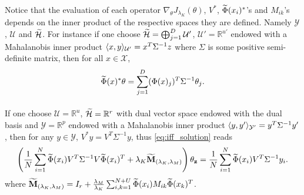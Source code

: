 \begin{remark}
\label{rq:mahalanobis}
Notice that the evaluation of each operator $\nabla_{\theta} J_{\lambda_K}(\theta)$, $V^*$, $\widetilde{\Phi}(x_i)^*$'s and $M_{ik}$'s depends on the inner product of the respective spaces they are defined. Namely $\mathcal{Y}$, $\mathcal{U}$ and $\widetilde{\mathcal{H}}$. For instance if one choose $\widetilde{\mathcal{H}}=\operatorname{\bigoplus}_{j=1}^D \mathcal{U}'$, $\mathcal{U}'=\mathbb{R}^{u'}$ endowed with a Mahalanobis inner product $\langle x,y\rangle_{\mathcal{U}'}=x^T\Sigma^{-1} z$ where $\Sigma$ is some positive semi-definite matrix, then for all $x\in\mathcal{X}$,
\begin{dmath*}
\tildePhi{\omega}(x)^*\theta=\sum_{j=1}^D(\Phi(x)_j)^T \Sigma^{-1}\theta_j.
\end{dmath*}
\paragraph{}
If one choose $\mathcal{U}=\mathbb{R}^u$, $\widetilde{\mathcal{H}}=\mathbb{R}^{r}$ with dual vector space endowed with the dual basis and $\mathcal{Y}=\mathbb{R}^p$ endowed with a Mahalanobis inner product $\langle y,y'\rangle_{\mathcal{Y}'}=y^T\Sigma^{-1} y'$, then for any $y\in\mathcal{Y}$, $V^*y=V^T\Sigma^{-1}y$, thus \cref{eq:iff_solution} reads
\begin{dmath*}
\left(\frac{1}{N}\sum_{i=1}^N \tildePhi{\omega}(x_i)V^T \Sigma^{-1}V\tildePhi{\omega}(x_i)^T + \lambda_K\widetilde{\mathbf{M}}_{\left(\lambda_K,\lambda_M\right)}\right)\theta_{\seq{z}} = \frac{1}{N}\sum_{i=1}^N \tildePhi{\omega}(x_i)V^T \Sigma^{-1} y_i.
\end{dmath*}
where $\widetilde{\mathbf{M}}_{\left(\lambda_K,\lambda_M\right)}=I_{r} + \frac{\lambda_M}{\lambda_K}\sum_{i,k=1}^{N+U}\widetilde{\Phi}(x_i)M_{ik}\widetilde{\Phi}(x_k)^T$.
\end{remark}
